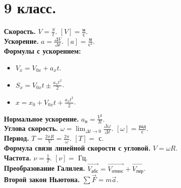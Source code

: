 \documentclass[12pt]{article}
\begin{document}
	
	
	
	
	\section{9 класс.}
	\textbf{Скорость.} $V = \frac{S}{t}$. $[V] = \frac{\text{м}}{\text{с}}$.\\
	\textbf{Ускорение.} $a = \frac{\varDelta V}{\varDelta t}$. $[a] = \frac{\text{м}}{\text{с}^2}$.\\
	\textbf{Формулы с ускорением:}
	\begin{itemize}
		\item $V_x = V_{0x} + a_xt$.
		\item $S_x = V_{0x}t \pm \frac{a_xt^2}{2}$.
		\item $x = x_0 + V_{0x}t + \frac{a_xt^2}{2}$.
	\end{itemize}
	\textbf{Нормальное ускорение.} $a_{\text{н}} = \frac{V^2}{R}$.\\
	\textbf{Углова скорость.} $\omega = \lim_{\varDelta t \rightarrow 0} \frac{\varDelta \varphi}{\varDelta t}$. $[\omega] = \frac{\text{рад}}{\text{с}}$.\\
	\textbf{Период.} $T = \frac{2 \pi R}{V} = \frac{2 \pi}{\omega}$. $[T] =$ с.\\
	\textbf{Формула связи линейной скорости с угловой.} $V = \omega R$.\\
	\textbf{Частота.} $\nu = \frac{1}{T}$. $[\nu] =$ Гц.\\
	\textbf{Преобразование Галилея.} $\vec{V_{\text{абс}}} = \vec{V_{\text{относ}}} + \vec{V_{\text{пер}}}$.\\
	\textbf{Второй закон Ньютона.} $\sum\vec{F} = m\vec{a}$.\\
\end{document}
